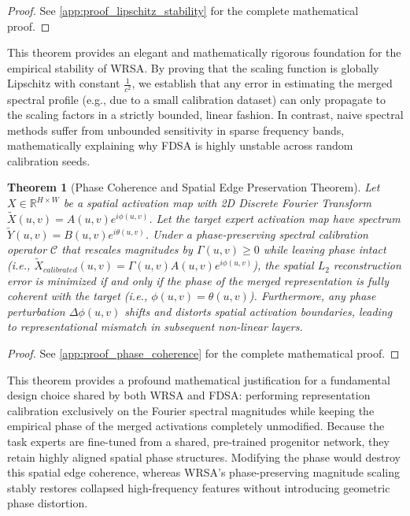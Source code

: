 \documentclass{article}
\theoremstyle{plain}
\newtheorem{theorem}{Theorem}[section]
\theoremstyle{definition}
\theoremstyle{remark}
\begin{document}
\begin{proof}
  See \cref{app:proof_lipschitz_stability} for the complete mathematical proof.
\end{proof}

This theorem provides an elegant and mathematically rigorous foundation for the empirical stability of WRSA. By proving that the scaling function is globally Lipschitz with constant $\frac{1}{c^2}$, we establish that any error in estimating the merged spectral profile (e.g., due to a small calibration dataset) can only propagate to the scaling factors in a strictly bounded, linear fashion. In contrast, naive spectral methods suffer from unbounded sensitivity in sparse frequency bands, mathematically explaining why FDSA is highly unstable across random calibration seeds.

\begin{theorem}[Phase Coherence and Spatial Edge Preservation Theorem]
  Let $X \in \mathbb{R}^{H \times W}$ be a spatial activation map with 2D Discrete Fourier Transform $\tilde{X}(u, v) = A(u, v) e^{i \phi(u, v)}$. Let the target expert activation map have spectrum $\tilde{Y}(u, v) = B(u, v) e^{i \theta(u, v)}$. Under a phase-preserving spectral calibration operator $\mathcal{C}$ that rescales magnitudes by $\Gamma(u, v) \ge 0$ while leaving phase intact (i.e., $\tilde{X}_{calibrated}(u, v) = \Gamma(u, v) A(u, v) e^{i \phi(u, v)}$), the spatial $L_2$ reconstruction error is minimized if and only if the phase of the merged representation is fully coherent with the target (i.e., $\phi(u, v) = \theta(u, v)$). Furthermore, any phase perturbation $\Delta \phi(u, v)$ shifts and distorts spatial activation boundaries, leading to representational mismatch in subsequent non-linear layers.
\end{theorem}

\begin{proof}
  See \cref{app:proof_phase_coherence} for the complete mathematical proof.
\end{proof}

This theorem provides a profound mathematical justification for a fundamental design choice shared by both WRSA and FDSA: performing representation calibration exclusively on the Fourier spectral magnitudes while keeping the empirical phase of the merged activations completely unmodified. Because the task experts are fine-tuned from a shared, pre-trained progenitor network, they retain highly aligned spatial phase structures. Modifying the phase would destroy this spatial edge coherence, whereas WRSA's phase-preserving magnitude scaling stably restores collapsed high-frequency features without introducing geometric phase distortion.
\end{document}
